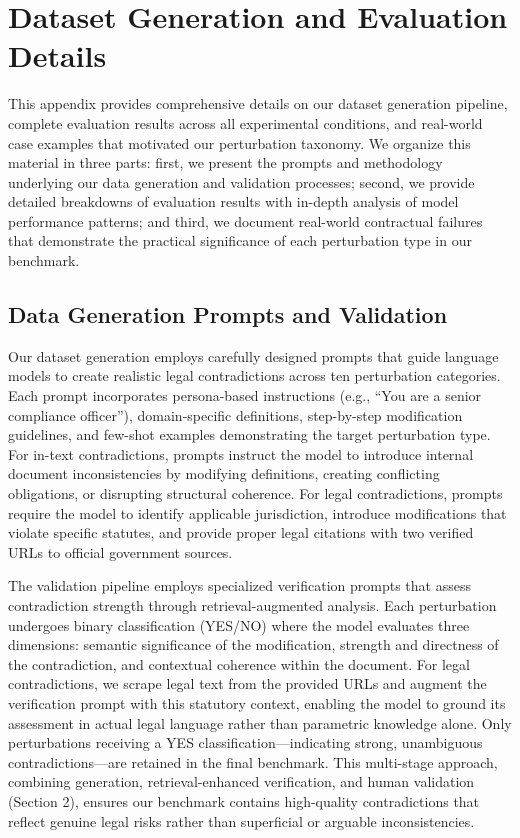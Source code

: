 \documentclass[11pt]{article}
\begin{document}
\section{Dataset Generation and Evaluation Details}
\label{sec:appendix-details}

This appendix provides comprehensive details on our dataset generation pipeline, complete evaluation results across all experimental conditions, and real-world case examples that motivated our perturbation taxonomy. We organize this material in three parts: first, we present the prompts and methodology underlying our data generation and validation processes; second, we provide detailed breakdowns of evaluation results with in-depth analysis of model performance patterns; and third, we document real-world contractual failures that demonstrate the practical significance of each perturbation type in our benchmark.

\subsection{Data Generation Prompts and Validation}
\label{sec:appendix-generation}

Our dataset generation employs carefully designed prompts that guide language models to create realistic legal contradictions across ten perturbation categories. Each prompt incorporates persona-based instructions (e.g., ``You are a senior compliance officer''), domain-specific definitions, step-by-step modification guidelines, and few-shot examples demonstrating the target perturbation type. For in-text contradictions, prompts instruct the model to introduce internal document inconsistencies by modifying definitions, creating conflicting obligations, or disrupting structural coherence. For legal contradictions, prompts require the model to identify applicable jurisdiction, introduce modifications that violate specific statutes, and provide proper legal citations with two verified URLs to official government sources.

The validation pipeline employs specialized verification prompts that assess contradiction strength through retrieval-augmented analysis. Each perturbation undergoes binary classification (YES/NO) where the model evaluates three dimensions: semantic significance of the modification, strength and directness of the contradiction, and contextual coherence within the document. For legal contradictions, we scrape legal text from the provided URLs and augment the verification prompt with this statutory context, enabling the model to ground its assessment in actual legal language rather than parametric knowledge alone. Only perturbations receiving a YES classification—indicating strong, unambiguous contradictions—are retained in the final benchmark. This multi-stage approach, combining generation, retrieval-enhanced verification, and human validation (Section 2), ensures our benchmark contains high-quality contradictions that reflect genuine legal risks rather than superficial or arguable inconsistencies.
\end{document}
